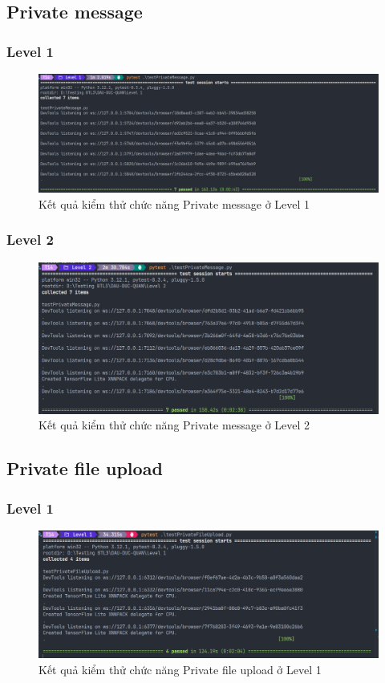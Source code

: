 \subsection{Private message}
\subsubsection{Level 1}
\begin{figure}[H]
    \centering
    \includegraphics[width=0.8\linewidth]{image/pm_lv1.png}
    \caption{Kết quả kiểm thử chức năng Private message ở Level 1}
\end{figure}

\subsubsection{Level 2}
\begin{figure}[H]
    \centering
    \includegraphics[width=0.8\linewidth]{image/pm_lv2.png}
    \caption{Kết quả kiểm thử chức năng Private message ở Level 2}
\end{figure}

\subsection{Private file upload}
\subsubsection{Level 1}
\begin{figure}[H]
    \centering
    \includegraphics[width=0.8\linewidth]{image/pf_lv1.png}
    \caption{Kết quả kiểm thử chức năng Private file upload ở Level 1}
\end{figure}

